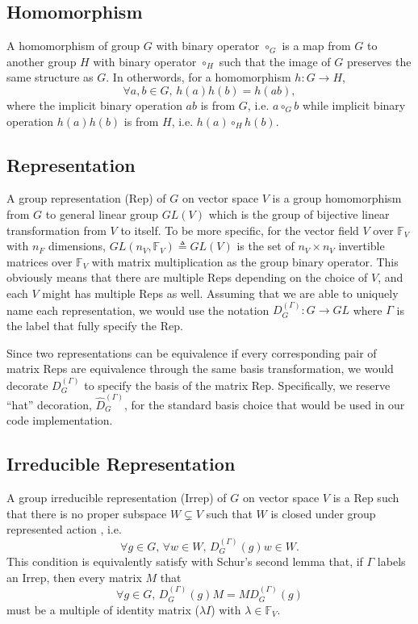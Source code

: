\documentclass[preprint, 12pt]{revtex4-2}
\numberwithin{equation}{section}
\begin{document}
\subsection{Homomorphism}
A homomorphism of group $G$ with binary operator $\circ_G$ is a map from $G$ to another group $H$ with binary operator $\circ_H$ such that the image of $G$ preserves the same structure as $G$. In otherwords, for a homomorphism $h:G\rightarrow H$,
\begin{equation}\label{eq:homomorphism}
    \forall a, b\in G,\, h(a)h(b) = h(ab),
\end{equation}
where the implicit binary operation $ab$ is from $G$, i.e. $a\circ_G b$ while implicit binary operation $h(a)h(b)$ is from $H$, i.e. $h(a)\circ_H h(b)$.

\subsection{Representation}
A group representation (Rep) of $G$ on vector space $V$ is a group homomorphism from $G$ to general linear group $GL(V)$ which is the group of bijective linear transformation from $V$ to itself. To be more specific, for the vector field $V$ over $\mathbb{F}_V$ with $n_F$ dimensions, $GL(n_V, \mathbb{F}_V)\triangleq GL(V)$ is the set of $n_V\times n_V$ invertible matrices over $\mathbb{F}_V$ with matrix multiplication as the group binary operator. This obviously means that there are multiple Reps depending on the choice of $V$, and each $V$ might has multiple Reps as well. Assuming that we are able to uniquely name each representation, we would use the notation $D_{G}^{(\Gamma)}:G\rightarrow GL$ where $\Gamma$ is the label that fully specify the Rep. 

Since two representations can be equivalence if every corresponding pair of matrix Reps are equivalence through the same basis transformation, we would decorate $D_{G}^{(\Gamma)}$ to specify the basis of the matrix Rep. Specifically, we reserve ``hat'' decoration, $\hat{D}_{G}^{(\Gamma)}$, for the standard basis choice that would be used in our code implementation.

\subsection{Irreducible Representation}
A group irreducible representation (Irrep) of $G$ on vector space $V$ is a Rep such that there is no proper subspace $W\subsetneq V$ such that $W$ is closed under group represented action , i.e.
\begin{equation}\label{eq:invariant subspace}
    \forall g\in G,\,\forall w\in W,\, D_{G}^{(\Gamma)}(g)w\in W.
\end{equation}
This condition is equivalently satisfy with Schur's second lemma that, if $\Gamma$ labels an Irrep, then every matrix $M$ that
\begin{equation}\label{eq:Schur's 2nd lemma}
    \forall g\in G,\,D_{G}^{(\Gamma)}(g)M=MD_{G}^{(\Gamma)}(g)
\end{equation}
must be a multiple of identity matrix ($\lambda I$) with $\lambda\in \mathbb{F}_V$.
\end{document}
